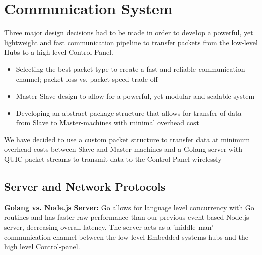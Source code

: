 \section{Communication System}
Three major design decisions had to be made in order to develop a powerful, yet lightweight and fast communication pipeline to transfer packets from the low-level Hubs to a high-level Control-Panel.
\begin{itemize}
    \item Selecting the best packet type to create a fast and reliable communication channel; packet loss vs. packet speed trade-off
    \item Master-Slave design to allow for a powerful, yet modular and scalable system
    \item Developing an abstract package structure that allows for transfer of data from Slave to Master-machines with minimal overhead cost
\end{itemize}
We have decided to use a custom packet structure to transfer data at minimum overhead costs between Slave and Master-machines and a Golang server with QUIC packet streams to transmit data to the Control-Panel wirelessly

\subsection{Server and Network Protocols}
\label{subsec:comm-protocols}
\textbf{Golang vs. Node.js Server:} Go allows for language level concurrency with Go routines and has faster raw performance than our previous event-based Node.js server, decreasing overall latency. The server acts as a 'middle-man' communication channel between the low level Embedded-systems hubs and the high level Control-panel.\\

